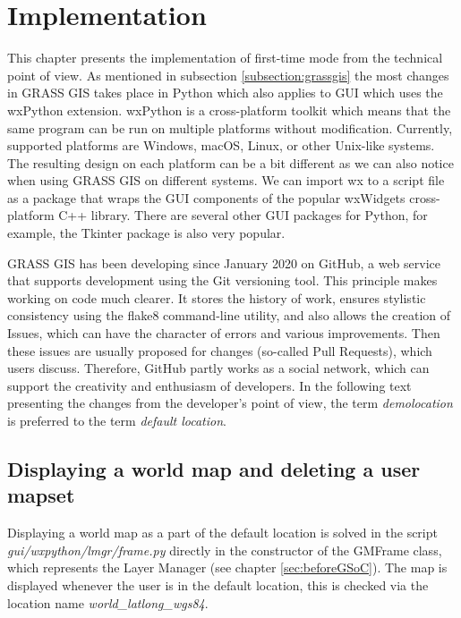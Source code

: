 \documentclass[a4paper,10pt,twoside]{article}
\begin{document}
\newpage
\vspace*{-1cm}
\section{Implementation}
\noindent
\large

\noindent This chapter presents the implementation of first-time mode from the technical point of view. As mentioned in subsection \ref{subsection:grassgis} the most changes in GRASS GIS takes place in Python which also applies to GUI which uses the wxPython extension. wxPython is a cross-platform toolkit which means that the same program can be run on multiple platforms without modification. Currently, supported platforms are Windows, macOS, Linux, or other Unix-like systems. The resulting design on each platform can be a bit different as we can also notice when using GRASS GIS on different systems. We can import wx to a script file as a package that wraps the GUI components of the popular wxWidgets cross-platform C++ library. There are several other GUI packages for Python, for example, the Tkinter package is also very popular.

GRASS GIS has been developing since January 2020 on GitHub, a web service that supports development using the Git versioning tool. This principle makes working on code much clearer. It stores the history of work, ensures stylistic consistency using the flake8 command-line utility, and also allows the creation of Issues, which can have the character of errors and various improvements. Then these issues are usually proposed for changes (so-called Pull Requests), which users discuss. Therefore, GitHub partly works as a social network, which can support the creativity and enthusiasm of developers. In the following text presenting the changes from the developer's point of view, the term \textit{demolocation} is preferred to the term \textit{default location}.

\subsection{Displaying a world map and deleting a user mapset}

\noindent \large Displaying a world map as a part of the default location is solved in the script \textit{gui/wxpython/lmgr/frame.py} directly in the constructor of the GMFrame class, which represents the Layer Manager (see chapter \ref{sec:beforeGSoC}). The map is displayed whenever the user is in the default location, this is checked via the location name \textit{world\_latlong\_wgs84}.
\end{document}
